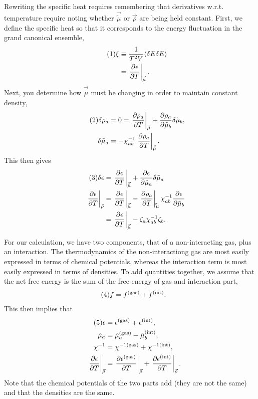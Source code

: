 \documentclass[12pt]{article}
\numberwithin{equation}{section}
\numberwithin{figure}{section}
\newcommand\eqnumber{\addtocounter{equation}{1}\tag{\theequation}}
\begin{document}
Rewriting the specific heat requires remembering that derivatives w.r.t. temperature require noting whether $\vec{\tilde{\mu}}$ or $\vec{\rho}$ are being held constant. First, we define the specific heat so that it corresponds to the energy fluctuation in the grand canonical ensemble,
\begin{align*}\eqnumber
\xi&\equiv\frac{1}{T^2V}\langle\delta E\delta E\rangle\\
&=\left.\frac{\partial\epsilon}{\partial T}\right|_{\vec{\tilde{\mu}}}.
\end{align*}
Next, you determine how $\vec{\tilde{\mu}}$ must be changing in order to maintain constant density,
\begin{align*}\eqnumber
\delta\rho_a&=0=\left.\frac{\partial\rho_a}{\partial T}\right|_{\vec{\tilde{\mu}}}+\frac{\partial\rho_a}{\partial\tilde{\mu}_b}\delta\tilde{\mu}_b,\\
\delta\tilde{\mu}_a&=-\chi^{-1}_{ab}\left.\frac{\partial\rho_a}{\partial T}\right|_{\vec{\tilde{\mu}}}.
\end{align*}
This then gives
\begin{align*}\eqnumber
\delta\epsilon&=\left.\frac{\partial\epsilon}{\partial T}\right|_{\vec{\tilde{\mu}}}+\frac{\partial\epsilon}{\partial\tilde{\mu}_a}\delta\tilde{\mu}_a\\
\left.\frac{\partial\epsilon}{\partial T}\right|_{\vec{\rho}}
&=\left.\frac{\partial\epsilon}{\partial T}\right|_{\vec{\tilde{\mu}}}-\left.\frac{\partial\rho_a}{\partial T}\right|_{\vec\tilde{\mu}}\chi^{-1}_{ab}\frac{\partial\epsilon}{\partial\tilde{\mu}_b}\\
&=\left.\frac{\partial\epsilon}{\partial T}\right|_{\vec{\tilde{\mu}}}-\zeta_a\chi^{-1}_{ab}\zeta_b.
\end{align*}

For our calculation, we have two components, that of a non-interacting gas, plus an interaction. The thermodynamics of the non-interactiong gas are most easily expressed in terms of chemical potentials, whereas the interaction term is most easily expressed in terms of densities. To add quantities together, we assume that the net free energy is the sum of the free energy of gas and interaction part,
\begin{align*}\eqnumber
f&=f^{\rm(gas)}+f^{\rm(int)}.
\end{align*}
This then implies that
\begin{align*}\eqnumber
\epsilon&=\epsilon^{\rm(gas)}+\epsilon^{\rm(int)},\\
\tilde{\mu}_a&=\tilde{\mu}_a^{\rm(gas)}+\tilde{\mu}_b^{\rm(int)},\\
\chi^{-1}&=\chi^{-1{\rm(gas)}}+\chi^{-1{\rm(int)}},\\
\left.\frac{\partial\epsilon}{\partial T}\right|_{\vec{\rho}}&=
\left.\frac{\partial\epsilon^{\rm(gas)}}{\partial T}\right|_{\vec{\rho}}
+\left.\frac{\partial\epsilon^{\rm(int)}}{\partial T}\right|_{\vec{\rho}}.
\end{align*}
Note that the chemical potentials of the two parts add (they are not the same) and that the densities are the same. 
\end{document}
